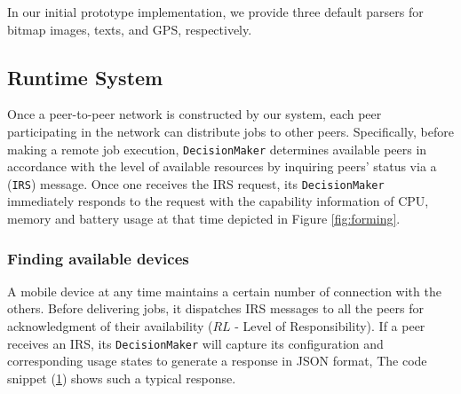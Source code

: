 \documentclass[conference]{IEEEtran}
\begin{document}
In our initial prototype implementation, we provide three default parsers for bitmap images, texts, and GPS, respectively. 

\subsection{Runtime System} \label{scheduling}
Once a peer-to-peer network is constructed by our system, each peer participating in the network can distribute jobs to other peers. Specifically, before making a remote job execution, \texttt{DecisionMaker} determines available peers in accordance with the level of available resources by inquiring peers' status via a (\texttt{IRS}) message. Once one receives the IRS request, its \texttt{DecisionMaker} immediately responds to the request with the capability information of CPU, memory and battery usage at that time depicted in Figure \ref{fig:forming}.


\subsubsection{Finding available devices}\label{ss_dfp}

A mobile device at any time maintains a certain number of connection with the others. Before delivering jobs, it dispatches IRS messages to all the peers for acknowledgment of their availability ($RL$ - Level of Responsibility). If a peer receives an IRS, its \texttt{DecisionMaker} will capture its configuration and corresponding usage states to generate a response in JSON format, The code snippet (\ref{code:jsonResponse}) shows such a typical response.\\

\begin{figure}
\noindent {}	\\
\noindent {}	

\label{code:jsonResponse}

\end{figure}
\end{document}
